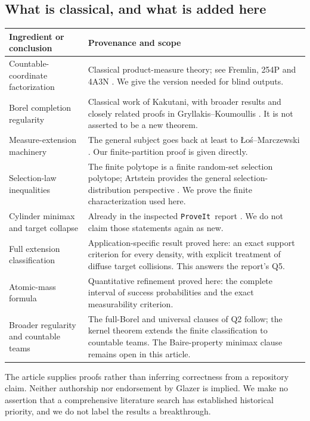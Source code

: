 \documentclass[11pt,letterpaper]{article}
\theoremstyle{definition}
\newcommand{\repo}{\texttt{ProveIt}}
\begin{document}
\subsection{What is classical, and what is added here}

\begin{longtable}{>{\raggedright\arraybackslash}p{}>{\raggedright\arraybackslash}p{}}
\toprule
Ingredient or conclusion & Provenance and scope\\
\midrule
\endhead
Countable-coordinate factorization & Classical product-measure theory; see Fremlin, 254P and 4A3N \cite{ext:Fremlin25,ext:Fremlin4A}. We give the version needed for blind outputs.\\[4pt]
Borel completion regularity & Classical work of Kakutani, with broader results and closely related proofs in Gryllakis--Koumoullis \cite{ext:Kakutani,ext:GK}. It is not asserted to be a new theorem.\\[4pt]
Measure-extension machinery & The general subject goes back at least to \L o\'s--Marczewski \cite{LosMarczewski}. Our finite-partition proof is given directly.\\[4pt]
Selection-law inequalities & The finite polytope is a finite random-set selection polytope; Artstein provides the general selection-distribution perspective \cite{ext:Artstein}. We prove the finite characterization used here.\\[4pt]
Cylinder minimax and target collapse & Already in the inspected \repo\ report \cite{ext:RepoReport}. We do not claim those statements again as new.\\[4pt]
Full extension classification & Application-specific result proved here: an exact support criterion for every density, with explicit treatment of diffuse target collisions. This answers the report's Q5.\\[4pt]
Atomic-mass formula & Quantitative refinement proved here: the complete interval of success probabilities and the exact measurability criterion.\\[4pt]
Broader regularity and countable teams & The full-Borel and universal clauses of Q2 follow; the kernel theorem extends the finite classification to countable teams. The Baire-property minimax clause remains open in this article.\\
\bottomrule
\end{longtable}

The article supplies proofs rather than inferring correctness from a repository claim. Neither authorship nor endorsement by Glazer is implied. We make no assertion that a comprehensive literature search has established historical priority, and we do not label the results a breakthrough.
\end{document}
